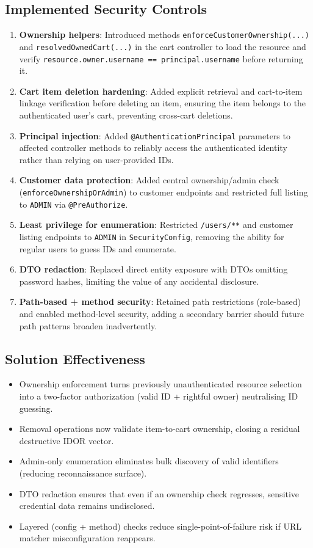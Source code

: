 \documentclass[]{UCD_CS_FYP_Report}
\begin{document}
\subsection{Implemented Security Controls}
\begin{enumerate}
	\item \textbf{Ownership helpers}: Introduced methods \texttt{enforceCustomerOwnership(...)} and \texttt{resolvedOwnedCart(...)} in the cart controller to load the resource and verify \texttt{resource.owner.username == principal.username} before returning it.
	\item \textbf{Cart item deletion hardening}: Added explicit retrieval and cart-to-item linkage verification before deleting an item, ensuring the item belongs to the authenticated user's cart, preventing cross-cart deletions.
	\item \textbf{Principal injection}: Added \texttt{@AuthenticationPrincipal} parameters to affected controller methods to reliably access the authenticated identity rather than relying on user-provided IDs.
	\item \textbf{Customer data protection}: Added central ownership/admin check (\texttt{enforceOwnershipOrAdmin}) to customer endpoints and restricted full listing to \texttt{ADMIN} via \texttt{@PreAuthorize}.
	\item \textbf{Least privilege for enumeration}: Restricted \texttt{/users/**} and customer listing endpoints to \texttt{ADMIN} in \texttt{SecurityConfig}, removing the ability for regular users to guess IDs and enumerate.
	\item \textbf{DTO redaction}: Replaced direct entity exposure with DTOs omitting password hashes, limiting the value of any accidental disclosure.
	\item \textbf{Path-based + method security}: Retained path restrictions (role-based) and enabled method-level security, adding a secondary barrier should future path patterns broaden inadvertently.
\end{enumerate}

\subsection{Solution Effectiveness}
\begin{itemize}
	\item Ownership enforcement turns previously unauthenticated resource selection into a two-factor authorization (valid ID + rightful owner) neutralising ID guessing.
	\item Removal operations now validate item-to-cart ownership, closing a residual destructive IDOR vector.
	\item Admin-only enumeration eliminates bulk discovery of valid identifiers (reducing reconnaissance surface).
	\item DTO redaction ensures that even if an ownership check regresses, sensitive credential data remains undisclosed.
	\item Layered (config + method) checks reduce single-point-of-failure risk if URL matcher misconfiguration reappears.
\end{itemize}
\end{document}
